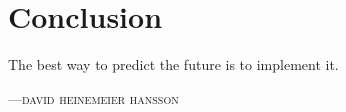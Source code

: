 %
%
%

\chapter{Conclusion}
\epigraph{The best way to predict the future is to implement it.}
{\textsc{---david heinemeier hansson}}

